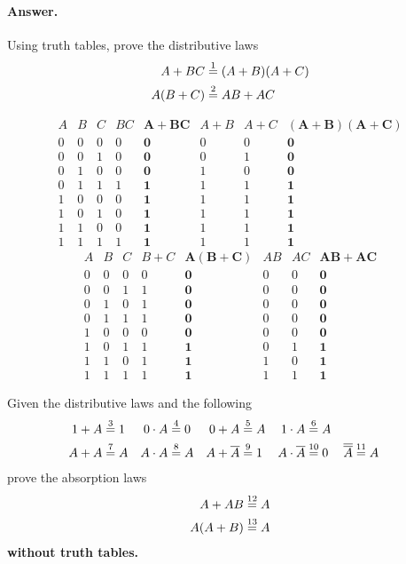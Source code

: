 \paragraph{Answer.}
Using truth tables, prove the distributive laws
\begin{align*}
A + BC  &\stackrel{1}{=} (A + B)(A + C)\\
A (B+C) &\stackrel{2}{=} AB + AC
\end{align*}

\[
\begin{array}{c|c|c||c|c|c|c|c}
  A & B & C & BC & \mathbf{A+BC} & A+B & A+C & \mathbf{(A+B)(A+C)}\\
\hline
  0 & 0 & 0 &  0 &    \mathbf{0} &   0 &   0 & \mathbf{0}\\
  0 & 0 & 1 &  0 &    \mathbf{0} &   0 &   1 & \mathbf{0}\\
  0 & 1 & 0 &  0 &    \mathbf{0} &   1 &   0 & \mathbf{0}\\
  0 & 1 & 1 &  1 &    \mathbf{1} &   1 &   1 & \mathbf{1}\\
  1 & 0 & 0 &  0 &    \mathbf{1} &   1 &   1 & \mathbf{1}\\
  1 & 0 & 1 &  0 &    \mathbf{1} &   1 &   1 & \mathbf{1}\\
  1 & 1 & 0 &  0 &    \mathbf{1} &   1 &   1 & \mathbf{1}\\
  1 & 1 & 1 &  1 &    \mathbf{1} &   1 &   1 & \mathbf{1}
\end{array}
\]
\[
\begin{array}{c|c|c||c|c|c|c|c}
  A & B & C & B+C & \mathbf{A(B+C)} & AB & AC & \mathbf{AB+AC}\\
\hline
  0 & 0 & 0 &   0 &      \mathbf{0} &  0 &  0 & \mathbf{0}\\
  0 & 0 & 1 &   1 &      \mathbf{0} &  0 &  0 & \mathbf{0}\\
  0 & 1 & 0 &   1 &      \mathbf{0} &  0 &  0 & \mathbf{0}\\
  0 & 1 & 1 &   1 &      \mathbf{0} &  0 &  0 & \mathbf{0}\\
  1 & 0 & 0 &   0 &      \mathbf{0} &  0 &  0 & \mathbf{0}\\
  1 & 0 & 1 &   1 &      \mathbf{1} &  0 &  1 & \mathbf{1}\\
  1 & 1 & 0 &   1 &      \mathbf{1} &  1 &  0 & \mathbf{1}\\
  1 & 1 & 1 &   1 &      \mathbf{1} &  1 &  1 & \mathbf{1}
\end{array}
\]


\noindent Given the distributive laws and the following
\begin{align*}
1 + A &\stackrel{3}{=} 1 & 0 \cdot A &\stackrel{4}{=} 0 & 0 + A &\stackrel{5}{=} A & 1
\cdot A &\stackrel{6}{=} A\\
A + A &\stackrel{7}{=} A & A \cdot A &\stackrel{8}{=} A & A + \overline{A} &\stackrel{9}{=}
1 & A \cdot \overline{A} &\stackrel{10}{=} 0 & \overline{\overline{A}}
&\stackrel{11}{=} A
\end{align*}
\noindent prove the absorption laws
\begin{align*}
A + AB &\stackrel{12}{=} A\\
A (A+B) &\stackrel{13}{=} A
\end{align*}
\textbf{without truth tables.}
